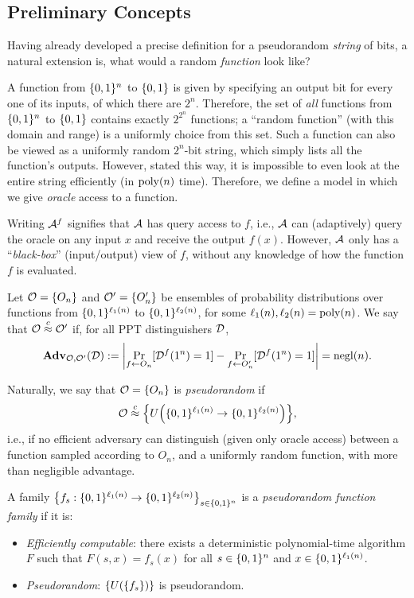 \documentclass[11pt]{article}
\begin{document}
\subsection{Preliminary Concepts}
\label{sec:preliminary-concepts}

Having already developed a precise definition for a pseudorandom
\emph{string} of bits, a natural extension is, what would a random
\emph{function} look like?

A function from $\bit^{n}$ to $\bit$ is given by specifying an output
bit for every one of its inputs, of which there are $2^{n}$.
Therefore, the set of \emph{all} functions from $\bit^{n}$ to $\bit$
contains exactly $2^{2^{n}}$ functions; a ``random function'' (with
this domain and range) is a uniformly choice from this set.  Such a
function can also be viewed as a uniformly random $2^{n}$-bit string,
which simply lists all the function's outputs.  However, stated this
way, it is impossible to even look at the entire string efficiently
(in $\poly(n)$ time).  Therefore, we define a model in which we give
\emph{oracle} access to a function.

Writing $\Adv^{f}$ signifies that $\Adv$ has query access to $f$,
i.e., $\Adv$ can (adaptively) query the oracle on any input $x$ and
receive the output $f(x)$.  However, $\Adv$ only has a
``\emph{black-box}'' (input/output) view of $f$, without any knowledge
of how the function $f$ is evaluated.

\begin{definition}
  Let $\Ora = \{O_{n}\}$ and $\Ora'=\{O'_{n}\}$ be ensembles of
  probability distributions over functions from
  $\bit^{\ell_{1}(n)}$ to $\bit^{\ell_{2}(n)}$, for some
  $\ell_{1}(n), \ell_{2}(n) = \poly(n)$.  We say that $\Ora \compind
  \Ora'$ if, for all PPT distinguishers $\Dist$,
  \[\advan_{\Ora,\Ora'}(\Dist) :=
  \abs*{\Pr_{f \gets O_{n}}[\Dist^{f}(1^n) = 1] - \Pr_{f \gets
      O'_{n}}[\Dist^{f}(1^n) = 1]} = \negl(n). \]
\end{definition}

Naturally, we say that $\Ora = \{O_{n}\}$ is \emph{pseudorandom} if \[
\Ora \compind \set*{U\parens*{\bit^{\ell_{1}(n)} \to
    \bit^{\ell_{2}(n)}}}, \] i.e., if no efficient adversary can
distinguish (given only oracle access) between a function sampled
according to $O_n$, and a uniformly random function, with more than
negligible advantage.

\begin{definition}
  A family $\set*{f_{s}: \bit^{\ell_{1}(n)} \rightarrow
    \bit^{\ell_2(n)}}_{s \in \bit^{n}}$ is a \emph{pseudorandom
    function family} if it is:
  \begin{itemize}
  \item \emph{Efficiently computable}: there exists a deterministic
    polynomial-time algorithm $F$ such that $F(s,x) = f_{s}(x)$ for
    all $s \in \bit^{n}$ and $x \in \bit^{\ell_{1}(n)}$.
  \item \emph{Pseudorandom}: $\set*{U(\set{f_{s}})}$ is
    pseudorandom.
  \end{itemize}
\end{definition}
\end{document}
